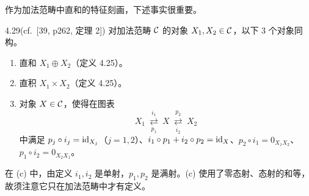 作为加法范畴中直和的特征刻画，下述事实很重要。

\begin{proposition}{4.29}(cf.\ [39, p262, 定理 2])
对加法范畴 $\mathcal{C}$ 的对象 $X_1,X_2\in\mathcal{C}$，以下 3 个对象同构。
\begin{enumerate}[label=(\alph*)]
  \item 直和 $X_1\oplus X_2$（定义 4.25）。
  \item 直积 $X_1\times X_2$（定义 4.25）。
  \item 对象 $X\in\mathcal{C}$，使得在图表
        \[
          X_1\ \underset{p_1}{\overset{i_1}{\rightleftarrows}}\ X\ \underset{i_2}{\overset{p_2}{\rightleftarrows}}\ X_2
        \]
        中满足 $p_j\circ i_j=\mathrm{id}_{X_j}$（$j=1,2$）、$i_1\circ p_1+i_2\circ p_2=\mathrm{id}_X$、$p_2\circ i_1=0_{X_1X_2}$、$p_1\circ i_2=0_{X_2X_1}$。
\end{enumerate}
\end{proposition}

在 (c) 中，由定义 $i_1,i_2$ 是单射，$p_1,p_2$ 是满射。(c) 使用了零态射、态射的和等，故须注意它只在加法范畴中才有定义。


